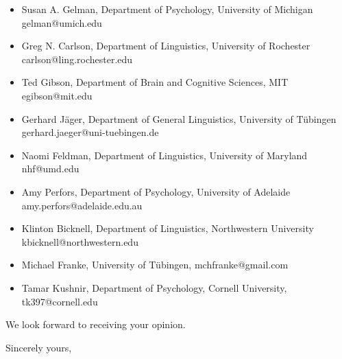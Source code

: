 \documentclass[11pt,letterpaper]{letter} %
\begin{document}
\begin{letter}
\begin{itemize}
\item Susan A. Gelman, Department of Psychology, University of Michigan gelman@umich.edu
\item Greg N. Carlson, Department of Linguistics, University of Rochester carlson@ling.rochester.edu
\item Ted Gibson, Department of Brain and Cognitive Sciences, MIT egibson@mit.edu
\item Gerhard J{\"a}ger, Department of General Linguistics, University of T{\"u}bingen gerhard.jaeger@uni-tuebingen.de
\item Naomi Feldman, Department of Linguistics, University of Maryland nhf@umd.edu
\item Amy Perfors, Department of Psychology, University of Adelaide amy.perfors@adelaide.edu.au
\item Klinton Bicknell, Department of Linguistics, Northwestern University kbicknell@northwestern.edu
\item Michael Franke, University of T{\"u}bingen, mchfranke@gmail.com
\item Tamar Kushnir, Department of Psychology, Cornell University, tk397@cornell.edu
\end{itemize}

We look forward to receiving your opinion.


\closing{Sincerely yours,}

\end{letter}
\end{document}
